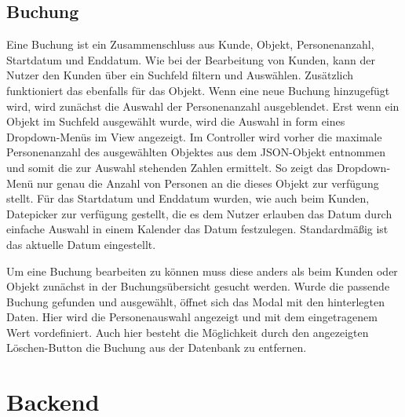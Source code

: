   
\subsection{Buchung}
Eine Buchung ist ein Zusammenschluss aus Kunde, Objekt, Personenanzahl, Startdatum und Enddatum. Wie bei der Bearbeitung von Kunden, kann der Nutzer den Kunden über ein Suchfeld filtern und Auswählen. Zusätzlich funktioniert das ebenfalls für das Objekt. 
Wenn eine neue Buchung hinzugefügt wird, wird zunächst die Auswahl der Personenanzahl ausgeblendet. Erst wenn ein Objekt im Suchfeld ausgewählt wurde, wird die Auswahl in form eines Dropdown-Menüs im View angezeigt. Im Controller wird vorher die maximale Personenanzahl des ausgewählten Objektes aus dem JSON-Objekt entnommen und somit die zur Auswahl stehenden Zahlen ermittelt. So zeigt das Dropdown-Menü nur genau die Anzahl von Personen an die dieses Objekt zur verfügung stellt. Für das Startdatum und Enddatum wurden, wie auch beim Kunden, Datepicker zur verfügung gestellt, die es dem Nutzer erlauben das Datum durch einfache Auswahl in einem Kalender das Datum festzulegen. Standardmäßig ist das aktuelle Datum eingestellt.

Um eine Buchung bearbeiten zu können muss diese anders als beim Kunden oder Objekt zunächst in der Buchungsübersicht gesucht werden. Wurde die passende Buchung gefunden und ausgewählt, öffnet sich das Modal mit den hinterlegten Daten. Hier wird die Personenauswahl angezeigt und mit dem eingetragenem Wert vordefiniert. Auch hier besteht die Möglichkeit durch den angezeigten Löschen-Button die Buchung aus der Datenbank zu entfernen.  


 
\section{Backend}
